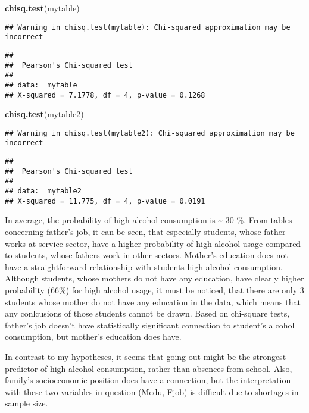 \documentclass[]{article}
\newenvironment{Shaded}{\begin{snugshade}}{\end{snugshade}}
\newcommand{\KeywordTok}[1]{\textcolor[rgb]{0.13,0.29,0.53}{\textbf{#1}}}
\newcommand{\NormalTok}[1]{#1}
\begin{document}
\begin{Shaded}
\begin{Highlighting}[]
\KeywordTok{chisq.test}\NormalTok{(mytable)}
\end{Highlighting}
\end{Shaded}

\begin{verbatim}
## Warning in chisq.test(mytable): Chi-squared approximation may be incorrect
\end{verbatim}

\begin{verbatim}
## 
##  Pearson's Chi-squared test
## 
## data:  mytable
## X-squared = 7.1778, df = 4, p-value = 0.1268
\end{verbatim}

\begin{Shaded}
\begin{Highlighting}[]
\KeywordTok{chisq.test}\NormalTok{(mytable2)}
\end{Highlighting}
\end{Shaded}

\begin{verbatim}
## Warning in chisq.test(mytable2): Chi-squared approximation may be incorrect
\end{verbatim}

\begin{verbatim}
## 
##  Pearson's Chi-squared test
## 
## data:  mytable2
## X-squared = 11.775, df = 4, p-value = 0.0191
\end{verbatim}

In average, the probability of high alcohol consumption is
\textasciitilde{} 30 \%. From tables concerning father's job, it can be
seen, that especially students, whose father works at service sector,
have a higher probability of high alcohol usage compared to students,
whose fathers work in other sectors. Mother's education does not have a
straightforward relationship with students high alcohol consumption.
Although students, whose mothers do not have any education, have clearly
higher probability (66\%) for high alcohol usage, it must be noticed,
that there are only 3 students whose mother do not have any education in
the data, which means that any conlcusions of those students cannot be
drawn. Based on chi-square tests, father's job doesn't have
statistically significant connection to student's alcohol consumption,
but mother's education does have.

In contrast to my hypotheses, it seems that going out might be the
strongest predictor of high alcohol consumption, rather than absences
from school. Also, family's socioeconomic position does have a
connection, but the interpretation with these two variables in question
(Medu, Fjob) is difficult due to shortages in sample size.
\end{document}
